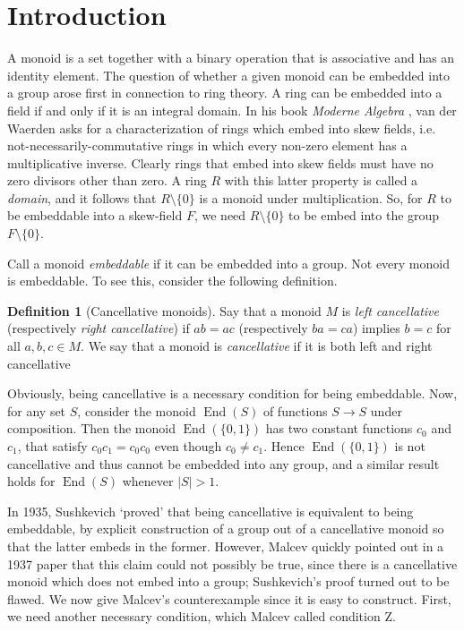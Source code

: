 \documentclass{article}
\theoremstyle{plain}
\theoremstyle{definition}
\newtheorem{defn}[thm]{Definition}
\DeclareMathOperator{\End}{End}
\begin{document}
	\section{Introduction}
	A monoid is a set together with a binary operation that is associative and has an identity element. The question of whether a given monoid can be embedded into a group arose first in connection to ring theory. A ring can be embedded into a field if and only if it is an integral domain. In his book \emph{Moderne Algebra} \cite[Vol. I, Chap. III, Sect. 12]{van1930moderne}, van der Waerden asks for a characterization of rings which embed into skew fields, i.e. not-necessarily-commutative rings in which every non-zero element has a multiplicative inverse. Clearly rings that embed into skew fields must have no zero divisors other than zero. A ring $R$ with this latter property is called a \emph{domain}, and it follows that $R\setminus\{0\}$ is a monoid under multiplication. So, for $R$ to be embeddable into a skew-field $F$, we need $R\setminus\{0\}$ to be embed into the group $F\setminus\{0\}$.
	
	Call a monoid \emph{embeddable} if it can be embedded into a group. Not every monoid is embeddable. To see this, consider the following definition.
	\begin{defn}[Cancellative monoids]
		Say that a monoid $M$ is \emph{left cancellative} (respectively \emph{right cancellative}) if $ab = ac$ (respectively $ba=ca$) implies $b = c$ for all $a,b,c\in M$. We say that a monoid is \emph{cancellative} if it is both left and right cancellative
	\end{defn}
	Obviously, being cancellative is a necessary condition for being embeddable. Now, for any set $S$, consider the monoid $\End(S)$ of functions $S\to S$ under composition. Then the monoid $\End(\{0,1\})$ has two constant functions $c_0$ and $c_1$, that satisfy $c_0 c_1 = c_0 c_0$ even though $c_0\neq c_1$. Hence $\End(\{0,1\})$ is not cancellative and thus cannot be embedded into any group, and a similar result holds for $\End(S)$ whenever $|S| > 1$.
	
	In 1935, Sushkevich \cite{sushkevich1935extension} `proved' that being cancellative is equivalent to being embeddable, by explicit construction of a group out of a cancellative monoid so that the latter embeds in the former. However, Malcev quickly pointed out in a 1937 paper \cite{malcev1937immersion} that this claim could not possibly be true, since there is a cancellative monoid which does not embed into a group; Sushkevich's proof turned out to be flawed.  We now give Malcev's counterexample since it is easy to construct. First, we need another necessary condition, which Malcev called condition Z.
	
\end{document}
